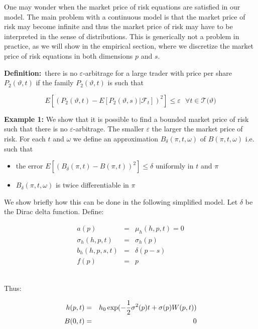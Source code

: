\documentclass{article}
\begin{document}
\bigskip

One may wonder when the market price of risk equations are satisfied in our
model. The main problem with a continuous model is that the market price of
risk may become infinite and thus the market price of risk may have to be
interpreted in the sense of distributions. This is generically not a problem
in practice, as we will show in the empirical section, where we discretize
the market price of risk equations in both dimensions $p$ and $s$.

\bigskip

\textbf{Definition:}\ there is no $\varepsilon $-arbitrage for a large
trader with price per share $P_{2}(\vartheta ,t)$ if the family $%
P_{2}(\vartheta ,t)$ is such that

\begin{equation*}
E[(P_{2}(\vartheta ,t)-E[P_{2}(\vartheta ,s)|\mathcal{F}_{t}])^{2}]\leq
\varepsilon \text{ \ \ \ }\forall t\in \mathcal{T(}\vartheta )
\end{equation*}

\textbf{Example 1: }We show that it is possible to find a bounded market
price of risk such that there is no $\varepsilon $-arbitrage. The smaller $%
\varepsilon $ the larger the market price of risk. For each $t$ and $\omega $
we define an approximation $B_{\delta }(\pi ,t,\omega )$ of $B(\pi ,t,\omega
)$ i.e. such that

\begin{itemize}
\item the error $E[(B_{\delta }(\pi ,t)-B(\pi ,t))^{2}]\leq \delta $
uniformly in $t$ and $\pi $

\item $B_{\delta }(\pi ,t,\omega )$ is twice differentiable in $\pi $
\end{itemize}

We show briefly how this can be done in the following simplified model. Let $%
\delta $ be the Dirac delta function. Define:

\begin{eqnarray*}
a(p) &=&\mu _{h}(h,p,t)=0 \\
\sigma _{h}(h,p,t) &=&\sigma _{h}(p) \\
b_{h}(h,p,s,t) &=&\delta (p-s) \\
f(p) &=&p
\end{eqnarray*}%
\bigskip\ 

Thus:

\begin{eqnarray}
h(p,t) &=&h_{0}\exp (-\frac{1}{2}\sigma ^{2}(p)t+\sigma (p)W(p,t))
\label{h_of_p} \\
B(0,t) &=&0  \notag
\end{eqnarray}%
\bigskip
\end{document}
